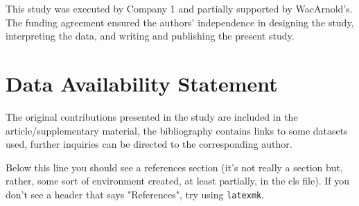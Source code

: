 \documentclass[utf8]{FrontiersinVancouver}   %
\begin{document}
This study was executed by Company 1 and partially supported by WacArnold's. 
The funding agreement ensured the authors' independence in designing the study, interpreting the
data, and writing and publishing the present study.



\section*{Data Availability Statement}

The original contributions presented in the study are included in the article/supplementary
material, the bibliography contains links to some datasets used, further inquiries can be directed
to the corresponding author.

Below this line you should see a references section (it's not really a section but, rather, some
sort of environment created, at least partially, in the cls file). If you don't see a header that
says "References", try using {\tt latexmk}.


%  


 


\nocite{*} %


\end{document}
